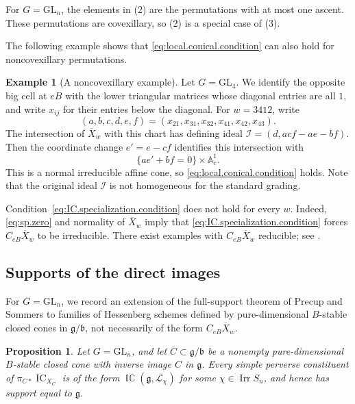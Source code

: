\documentclass[11pt]{amsart}
\numberwithin{equation}{section}
\newtheorem{proposition}[theorem]{Proposition}
\theoremstyle{definition}
\newtheorem{example}[theorem]{Example}
\DeclareMathOperator{\Irr}{\mathrm{Irr}}
\DeclareMathOperator{\IC}{\mathrm{IC}}
\DeclareMathOperator{\ICperv}{\mathbb{IC}}
\def\A{\mathbb{A}}
\def\fg{\mathfrak {g}}
\def\fb{\mathfrak {b}}
\begin{document}
For $G=\mathrm{GL}_n$, the elements in (2) are the permutations with at most one ascent.
These permutations are covexillary, so (2) is a special case of (3).

The following example shows that \eqref{eq:local.conical.condition} can also hold for noncovexillary permutations.
\begin{example}[A noncovexillary example]
\label{ex:nonlinear.3412}
Let $G=\mathrm{GL}_4$. We identify the opposite big cell at $eB$ with the lower triangular matrices whose diagonal entries are all $1$, and write $x_{ij}$ for their entries below the diagonal.
For $w=3412$, write
\[
(a,b,c,d,e,f)=(x_{21},x_{31},x_{32},x_{41},x_{42},x_{43}).
\]
The intersection of $\overline X_w$ with this chart has defining ideal $\mathcal I=(d,acf-ae-bf)$.
Then the coordinate change $e'=e-cf$ identifies this intersection with
\[
\{ae'+bf=0\}\times\A^1_c.
\]
This is a normal irreducible affine cone, so \eqref{eq:local.conical.condition} holds.
Note that the original ideal $\mathcal I$ is not homogeneous for the standard grading.
\end{example}


Condition~\eqref{eq:IC.specialization.condition} does not hold for every $w$.
Indeed, \eqref{eq:sp.zero} and normality of $\overline X_w$ imply that \eqref{eq:IC.specialization.condition} forces $C_{eB}\overline X_w$ to be irreducible.
There exist examples with $C_{eB}\overline X_w$ reducible; see \cite%
{fuchs.et.al}.


\subsection{Supports of the direct images}
\label{ss:nonlinear.domination}

For $G=\mathrm{GL}_n$, we record an extension of the full-support theorem of Precup and Sommers \cite{PS} to families of Hessenberg schemes defined by pure-dimensional $B$-stable closed cones in $\fg/\fb$, not necessarily of the form $C_{eB}\overline X_w$.

\begin{proposition}\label{prop:cone.typeA.support}
Let $G=\mathrm{GL}_n$, and let $\overline C\subset\fg/\fb$ be a nonempty pure-dimensional $B$-stable closed cone with inverse image $C$ in $\fg$.
Every simple perverse constituent of $\pi_{C*}\IC_{X_{C}}$ is of the form $\ICperv(\fg,\mathcal L_\chi)$ for some $\chi\in\Irr S_n$, and hence has support equal to $\fg$.
\end{proposition}
\end{document}
